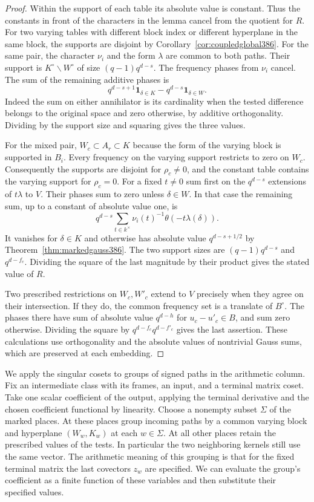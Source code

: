 \documentclass[a4paper,11pt]{article}
\theoremstyle{definition}
\theoremstyle{remark}
\numberwithin{equation}{section}
\begin{document}
\begin{proof}
Within the support of each table its absolute value is constant.
Thus the constants in front of the characters in the lemma
cancel from the quotient for \(R\). For two varying tables
with different block index or different hyperplane in the same
block, the supports are disjoint by
Corollary~\ref{cor:coupledglobal386}. For the same pair, the
character \(\nu_i\) and the form \(\lambda\) are common to
both paths. Their support is \(K^\circ\smallsetminus W^\circ\)
of size \((q-1)q^{d-s}\). The frequency phases from \(\nu_i\)
cancel. The sum of the remaining additive phases is
\[
       q^{d-s+1}\mathbf1_{\delta\in K}
           -q^{d-s}\mathbf1_{\delta\in W}.
\]
Indeed the sum on either annihilator is its cardinality when
the tested difference belongs to the original space and zero
otherwise, by additive orthogonality. Dividing by the support
size and squaring gives the three values.

For the mixed pair, \(W_c\subset A_r\subset K\) because
the form of the varying block is supported in \(B_i\).
Every frequency on the varying support restricts to zero on
\(W_c\). Consequently the supports are disjoint for
\(\rho_c\ne0\), and the constant table contains the varying
support for \(\rho_c=0\). For a fixed \(t\ne0\) sum first on
the \(q^{d-s}\) extensions of \(t\lambda\) to \(V\).
Their phases sum to zero unless \(\delta\in W\).
In that case the remaining sum, up to a constant of absolute
value one, is
\[
       q^{d-s}\sum_{t\in k^\times}
                \nu_i(t)^{-1}\theta(-t\lambda(\delta)).
\]
It vanishes for \(\delta\in K\) and otherwise has absolute
value \(q^{d-s+1/2}\) by Theorem~\ref{thm:markedgauss386}.
The two support sizes are \((q-1)q^{d-s}\) and \(q^{d-f_c}\).
Dividing the square of the last magnitude by their product
gives the stated value of \(R\).

Two prescribed restrictions on \(W_c,W'_c\) extend to \(V\)
precisely when they agree on their intersection. If they do,
the common frequency set is a translate of \(B^\circ\).
The phases there have sum of absolute value \(q^{d-h}\)
for \(u_c-u'_c\in B\), and sum zero otherwise. Dividing the
square by \(q^{d-f_c}q^{d-f'_c}\) gives the last assertion.
These calculations use orthogonality and the absolute values
of nontrivial Gauss sums, which are preserved at each embedding.
\end{proof}

We apply the singular cosets to groups of signed paths in the
arithmetic column. Fix an intermediate class with its frames,
an input, and a terminal matrix coset. Take one scalar
coefficient of the output, applying the terminal derivative
and the chosen coefficient functional by linearity. Choose a
nonempty subset \(\Sigma\) of the marked places. At these places
group incoming paths by a common varying block and hyperplane
\((W_w,K_w)\) at each \(w\in\Sigma\). At all other places
retain the prescribed values of the tests. In particular
the two neighboring kernels still use the same vector.
The arithmetic meaning of this grouping is that for the fixed
terminal matrix the last covectors \(z_w\) are specified. We
can evaluate the group's coefficient as a finite function of
these variables and then substitute their specified values.
\end{document}

